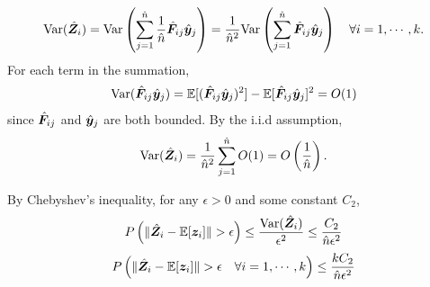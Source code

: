 \begin{enumerate}
\[
    \mathrm{Var}(\hat{{\bm{Z}}}_i) = \mathrm{Var} \left( \sum_{j = 1}^{\hat{n}} \frac{1}{\hat{n}} \hat{{\bm{F}}}_{ij}\hat{{\bm{y}}}_j \right) = \frac{1}{\hat{n}^2} \mathrm{Var} \left( \sum_{j = 1}^{\hat{n}} \hat{{\bm{F}}}_{ij}\hat{{\bm{y}}}_j \right) \quad \forall i = 1, \cdots, k. 
\]
For each term in the summation, 
\begin{align*}
    \mathrm{Var}(\hat{{\bm{F}}}_{ij}\hat{{\bm{y}}}_j) = \mathbb{E}[(\hat{{\bm{F}}}_{ij}\hat{{\bm{y}}}_j)^2] - \mathbb{E}[\hat{{\bm{F}}}_{ij}\hat{{\bm{y}}}_j]^2 = O(1) 
\end{align*}
since $\hat{{\bm{F}}}_{ij}$ and $\hat{{\bm{y}}}_j$ are both bounded. By the i.i.d assumption, 
\[
    \mathrm{Var}(\hat{{\bm{Z}}}_i) = \frac{1}{\hat{n}^2} \sum_{j = 1}^{\hat{n}} O(1) = O\left(\frac{1}{\hat{n}}\right). 
\]

By Chebyshev's inequality, for any \(\epsilon > 0\) and some constant $C_2$, 
\[
P\left(\|\hat{{\bm{Z}}}_i- \mathbb{E}[{\bm{z}}_i]\| > \epsilon\right) \leq \frac{\mathrm{Var}(\hat{{\bm{Z}}}_i)}{\epsilon^2} \leq \frac{C_2}{\hat{n} \epsilon^2} 
\]
\[
P\left(\|\hat{{\bm{Z}}}_i- \mathbb{E}[{\bm{z}}_i]\| > \epsilon \quad \forall i = 1, \cdots, k\right) \leq \frac{kC_2}{\hat{n} \epsilon^2} 
\]


\end{enumerate}
